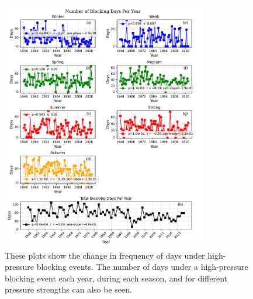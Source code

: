 \begin{figure}[H]
    \centering
    \includegraphics[width=0.8\textwidth]{Figures/blocking_days_per_year_all.pdf}
    \caption{These plots show the change in frequency of days under high-pressure blocking events. The number of days under a high-pressure blocking event each year, during each season, and for different pressure strengths can also be seen.}
    \label{fig:Number_of_Blocking_Days_Per_Year}
\end{figure}







